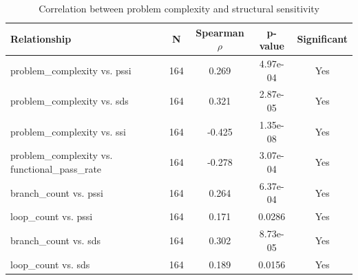 \begin{table}[t]
\centering
\caption{Correlation between problem complexity and structural sensitivity}
\label{tab:problem_complexity_correlation}
\begin{tabular}{lcccc}
\toprule
Relationship & N & Spearman $\rho$ & p-value & Significant \\
\midrule
problem\_complexity vs. pssi & 164 & 0.269 & 4.97e-04 & Yes \\
problem\_complexity vs. sds & 164 & 0.321 & 2.87e-05 & Yes \\
problem\_complexity vs. ssi & 164 & -0.425 & 1.35e-08 & Yes \\
problem\_complexity vs. functional\_pass\_rate & 164 & -0.278 & 3.07e-04 & Yes \\
branch\_count vs. pssi & 164 & 0.264 & 6.37e-04 & Yes \\
loop\_count vs. pssi & 164 & 0.171 & 0.0286 & Yes \\
branch\_count vs. sds & 164 & 0.302 & 8.73e-05 & Yes \\
loop\_count vs. sds & 164 & 0.189 & 0.0156 & Yes \\
\bottomrule
\end{tabular}
\end{table}
